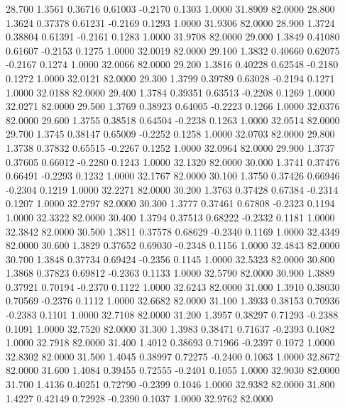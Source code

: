   28.700   1.3561   0.36716   0.61003  -0.2170   0.1303   1.0000  31.8909  82.0000
  28.800   1.3624   0.37378   0.61231  -0.2169   0.1293   1.0000  31.9306  82.0000
  28.900   1.3724   0.38804   0.61391  -0.2161   0.1283   1.0000  31.9708  82.0000
  29.000   1.3849   0.41080   0.61607  -0.2153   0.1275   1.0000  32.0019  82.0000
  29.100   1.3832   0.40660   0.62075  -0.2167   0.1274   1.0000  32.0066  82.0000
  29.200   1.3816   0.40228   0.62548  -0.2180   0.1272   1.0000  32.0121  82.0000
  29.300   1.3799   0.39789   0.63028  -0.2194   0.1271   1.0000  32.0188  82.0000
  29.400   1.3784   0.39351   0.63513  -0.2208   0.1269   1.0000  32.0271  82.0000
  29.500   1.3769   0.38923   0.64005  -0.2223   0.1266   1.0000  32.0376  82.0000
  29.600   1.3755   0.38518   0.64504  -0.2238   0.1263   1.0000  32.0514  82.0000
  29.700   1.3745   0.38147   0.65009  -0.2252   0.1258   1.0000  32.0703  82.0000
  29.800   1.3738   0.37832   0.65515  -0.2267   0.1252   1.0000  32.0964  82.0000
  29.900   1.3737   0.37605   0.66012  -0.2280   0.1243   1.0000  32.1320  82.0000
  30.000   1.3741   0.37476   0.66491  -0.2293   0.1232   1.0000  32.1767  82.0000
  30.100   1.3750   0.37426   0.66946  -0.2304   0.1219   1.0000  32.2271  82.0000
  30.200   1.3763   0.37428   0.67384  -0.2314   0.1207   1.0000  32.2797  82.0000
  30.300   1.3777   0.37461   0.67808  -0.2323   0.1194   1.0000  32.3322  82.0000
  30.400   1.3794   0.37513   0.68222  -0.2332   0.1181   1.0000  32.3842  82.0000
  30.500   1.3811   0.37578   0.68629  -0.2340   0.1169   1.0000  32.4349  82.0000
  30.600   1.3829   0.37652   0.69030  -0.2348   0.1156   1.0000  32.4843  82.0000
  30.700   1.3848   0.37734   0.69424  -0.2356   0.1145   1.0000  32.5323  82.0000
  30.800   1.3868   0.37823   0.69812  -0.2363   0.1133   1.0000  32.5790  82.0000
  30.900   1.3889   0.37921   0.70194  -0.2370   0.1122   1.0000  32.6243  82.0000
  31.000   1.3910   0.38030   0.70569  -0.2376   0.1112   1.0000  32.6682  82.0000
  31.100   1.3933   0.38153   0.70936  -0.2383   0.1101   1.0000  32.7108  82.0000
  31.200   1.3957   0.38297   0.71293  -0.2388   0.1091   1.0000  32.7520  82.0000
  31.300   1.3983   0.38471   0.71637  -0.2393   0.1082   1.0000  32.7918  82.0000
  31.400   1.4012   0.38693   0.71966  -0.2397   0.1072   1.0000  32.8302  82.0000
  31.500   1.4045   0.38997   0.72275  -0.2400   0.1063   1.0000  32.8672  82.0000
  31.600   1.4084   0.39455   0.72555  -0.2401   0.1055   1.0000  32.9030  82.0000
  31.700   1.4136   0.40251   0.72790  -0.2399   0.1046   1.0000  32.9382  82.0000
  31.800   1.4227   0.42149   0.72928  -0.2390   0.1037   1.0000  32.9762  82.0000
